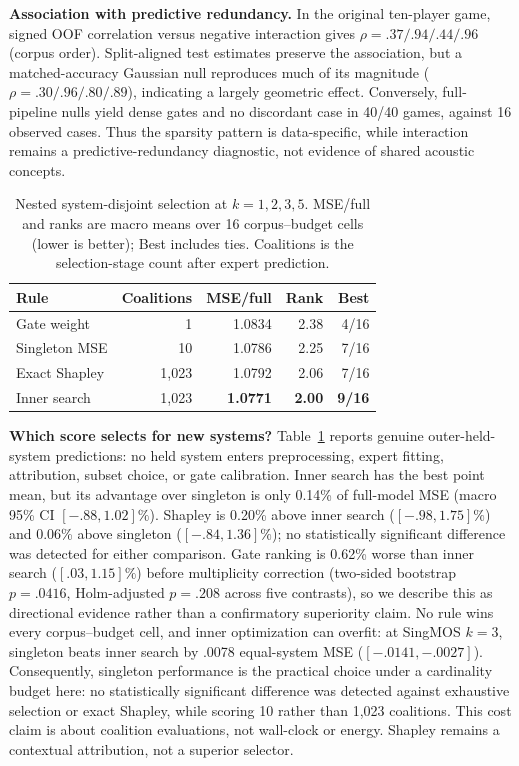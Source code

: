 \documentclass{article}
\begin{document}
\noindent\textbf{Association with predictive redundancy.} In the original
ten-player game, signed OOF correlation versus negative interaction gives
$\rho=.37/.94/.44/.96$ (corpus order). Split-aligned test estimates preserve
the association, but a matched-accuracy Gaussian null reproduces much of its
magnitude ($\rho=.30/.96/.80/.89$), indicating a largely geometric effect.
Conversely, full-pipeline nulls yield dense gates and no discordant case in
40/40 games, against 16 observed cases. Thus the sparsity pattern is
data-specific, while interaction remains a predictive-redundancy diagnostic,
not evidence of shared acoustic concepts.

\begin{table}[!t]
\caption{Nested system-disjoint selection at $k=1,2,3,5$. MSE/full and ranks
are macro means over 16 corpus--budget cells (lower is better); Best includes
ties. Coalitions is the selection-stage count after expert prediction.}
\label{tab:selection}
\centering
\small
\begin{tabular}{lrrrr}
\toprule
Rule & Coalitions & MSE/full & Rank & Best \\
\midrule
Gate weight & 1 & 1.0834 & 2.38 & 4/16 \\
Singleton MSE & 10 & 1.0786 & 2.25 & 7/16 \\
Exact Shapley & 1,023 & 1.0792 & 2.06 & 7/16 \\
Inner search & 1,023 & \textbf{1.0771} & \textbf{2.00} & \textbf{9/16} \\
\bottomrule
\end{tabular}
\end{table}

\noindent\textbf{Which score selects for new systems?}
Table~\ref{tab:selection} reports genuine outer-held-system predictions: no
held system enters preprocessing, expert fitting, attribution, subset choice,
or gate calibration. Inner search has the best point mean, but its advantage
over singleton is only 0.14\% of full-model MSE (macro 95\% CI
$[-.88,1.02]\%$). Shapley is 0.20\% above inner search
($[-.98,1.75]\%$) and 0.06\% above singleton ($[-.84,1.36]\%$); no statistically significant
difference was detected for either comparison. Gate ranking is 0.62\% worse than inner search
($[.03,1.15]\%$) before multiplicity correction (two-sided bootstrap $p=.0416$,
Holm-adjusted $p=.208$ across five contrasts), so we describe this as directional
evidence rather than a confirmatory superiority claim. No rule wins every
corpus--budget cell, and inner optimization can overfit: at SingMOS $k=3$,
singleton beats inner search by .0078 equal-system MSE
($[-.0141,-.0027]$). Consequently, singleton performance is the practical
choice under a cardinality budget here: no statistically significant difference
was detected against exhaustive selection or exact Shapley, while scoring 10 rather than 1,023
coalitions. This cost claim is about coalition evaluations, not wall-clock or
energy. Shapley remains a contextual attribution, not a superior selector.
\end{document}
